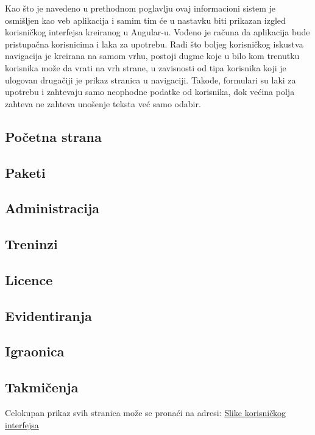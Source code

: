\documentclass[../main.tex]{subfiles}
\begin{document}
Kao što je navedeno u prethodnom poglavlju ovaj informacioni sistem je osmišljen kao veb aplikacija i samim tim će u nastavku biti prikazan izgled korisničkog interfejsa kreiranog u Angular-u.
Vođeno je računa da aplikacija bude pristupačna korisnicima i laka za upotrebu. Radi što boljeg korisničkog iskustva navigacija je kreirana na samom vrhu, postoji dugme koje u bilo kom trenutku korisnika može da vrati na vrh strane, u zavisnosti od tipa korisnika koji je ulogovan drugačiji je prikaz stranica u navigaciji. Takođe, formulari su laki za upotrebu i zahtevaju samo neophodne podatke od korisnika, dok većina polja zahteva ne zahteva unošenje teksta već samo odabir.

\subsection{Početna strana}


\subsection{Paketi}


\subsection{Administracija}


\subsection{Treninzi}


\subsection{Licence}


\subsection{Evidentiranja}


\subsection{Igraonica}


\subsection{Takmičenja}


Celokupan prikaz svih stranica može se pronaći na adresi: \href{https://github.com/jovanape/Informacioni-sistem-za-teretane/tree/main/screenshot-ovi_web_aplikacije}{Slike korisničkog interfejsa}
\end{document}
